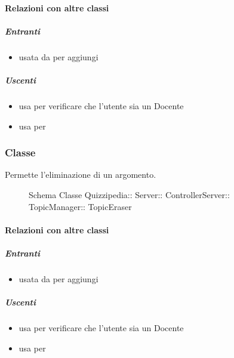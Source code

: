 \paragraph{Relazioni con altre classi}
\subparagraph{Entranti}
\begin{itemize}
\item usata da  per aggiungi
\end{itemize}
\subparagraph{Uscenti}
\begin{itemize}
\item usa  per verificare che l'utente sia un Docente
\item usa  per 
\end{itemize}
\subsubsection{Classe }
Permette l'eliminazione di un argomento.
\begin{figure}[H]
\centering
\noindent{}
\caption[Schema Classe TopicEraser]{Schema Classe Quizzipedia:: Server:: ControllerServer:: TopicManager:: TopicEraser}
\end{figure}
\paragraph{Relazioni con altre classi}
\subparagraph{Entranti}
\begin{itemize}
\item usata da  per aggiungi
\end{itemize}
\subparagraph{Uscenti}
\begin{itemize}
\item usa  per verificare che l'utente sia un Docente
\item usa  per 
\end{itemize}
